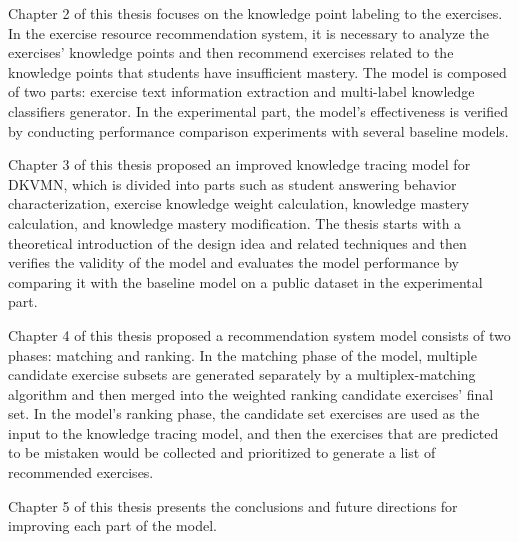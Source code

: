 Chapter 2 of this thesis focuses on the knowledge point labeling to the exercises. In the exercise resource recommendation system, it is necessary to analyze the exercises' knowledge points and then recommend exercises related to the knowledge points that students have insufficient mastery. The model is composed of two parts: exercise text information extraction and multi-label knowledge classifiers generator. In the experimental part, the model's effectiveness is verified by conducting performance comparison experiments with several baseline models.

Chapter 3 of this thesis proposed an improved knowledge tracing model for DKVMN, which is divided into parts such as student answering behavior characterization, exercise knowledge weight calculation, knowledge mastery calculation, and knowledge mastery modification. The thesis starts with a theoretical introduction of the design idea and related techniques and then verifies the validity of the model and evaluates the model performance by comparing it with the baseline model on a public dataset in the experimental part.

Chapter 4 of this thesis proposed a recommendation system model consists of two phases: matching and ranking. In the matching phase of the model, multiple candidate exercise subsets are generated separately by a multiplex-matching algorithm and then merged into the weighted ranking candidate exercises' final set. In the model's ranking phase, the candidate set exercises are used as the input to the knowledge tracing model, and then the exercises that are predicted to be mistaken would be collected and prioritized to generate a list of recommended exercises.

Chapter 5 of this thesis presents the conclusions and future directions for improving each part of the model.

